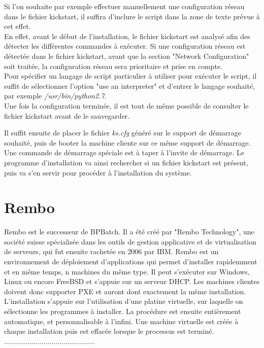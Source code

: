 \documentclass[a4paper,12pt,one side,titlepage]{report}
\begin{document}
\vspace{1em}
Si l'on souhaite par exemple effectuer manuellement une configuration réseau dans le fichier kickstart, il suffira d'inclure le script dans la zone de texte prévue à cet effet.\\
En effet, avant le début de l'installation, le fichier kickstart est analysé afin des détecter les différentes commandes à exécuter. Si une configuration réseau est détectée dans le fichier kickstart, avant que la section "Network Configuration" soit traitée, la configuration réseau sera prioritaire et prise en compte.\\
Pour spécifier un langage de script particulier à utiliser pour exécuter le script, il suffit de sélectionner l'option "use an interpreter" et d'entrer le langage souhaité, par exemple \textit{/usr/bin/python2.7}.\\

Une fois la configuration terminée, il est tout de même possible de consulter le fichier kickstart avant de le sauvegarder.

Il suffit ensuite de placer le fichier \textit{ks.cfg} généré sur le support de démarrage souhaité, puis de booter la machine cliente sur ce même support de démarrage. Une commande de démarrage spéciale est à taper à l'invite de démarrage. Le programme d'installation va ainsi rechercher si un fichier kickstart est présent, puis va s'en servir pour procéder à l'installation du système.

\section{Rembo}
Rembo est le successeur de BPBatch. Il a été créé par "Rembo Technology", une société suisse spécialisée dans les outils de gestion applicative et de virtualisation de serveurs, qui fut ensuite rachetée en 2006 par IBM. Rembo est un environnement de déploiement d'applications qui permet d'installer rapidemment et en même temps, n machines du même type. Il peut s’exécuter sur Windows, Linux ou encore FreeBSD et s’appuie sur un serveur DHCP. Les machines clientes doivent donc supporter PXE et auront dont exactement la même installation.\\

L'installation s'appuie sur l'utilisation d'une platine virtuelle, sur laquelle on sélectionne les programmes à installer. La procédure est ensuite entièrement automatique, et personnalisable à l'infini. Une machine virtuelle est créée à chaque installation puis est effacée lorsque le processus est terminé.\\
..............................................
\end{document}
